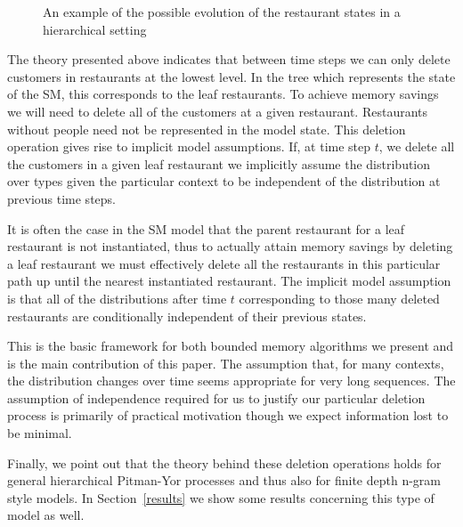 \begin{figure}[t] 
	\begin{center}
		\caption{An example of the possible evolution of the restaurant states in a hierarchical setting}
		\label{figResultsCC}
	\end{center} 
\end{figure} 

The theory presented above indicates that between time steps we can only delete customers in restaurants at the lowest level.  In the tree which represents the state of the SM, this corresponds to the leaf restaurants.  To achieve memory savings we will need to delete all of the customers at a given restaurant.  Restaurants without people need not be represented in the model state.  This deletion operation gives rise to implicit model assumptions. If, at time step $t$, we delete all the customers in a given leaf restaurant we implicitly assume the distribution over types given the particular context to be independent of the distribution at previous time steps.

It is often the case in the SM model that the parent restaurant for a leaf restaurant is not instantiated, thus to actually attain memory savings by deleting a leaf restaurant we must effectively delete all the restaurants in this particular path up until the nearest instantiated restaurant.  The implicit model assumption is that all of the distributions after time $t$ corresponding to those many deleted restaurants are conditionally independent of their previous states.

This is the basic framework for both bounded memory algorithms we present and is the main contribution of this paper.  The assumption that, for many contexts, the distribution changes over time seems appropriate for very long sequences. The assumption of independence required for us to justify our particular deletion process is primarily of practical motivation though we expect information lost to be minimal. 

Finally, we point out that the theory behind these deletion operations holds for general hierarchical Pitman-Yor processes and thus also for finite depth n-gram style models.  In Section~\ref{results} we show some results concerning this type of model as well.
